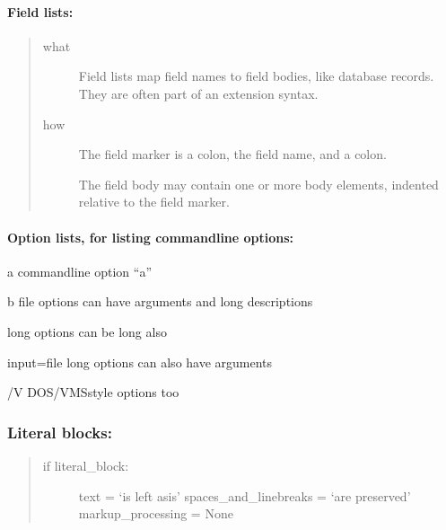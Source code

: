 \documentclass[a4paper,10pt,english]{report}
\begin{document}
\paragraph{Field lists:}
\label{\detokenize{prirucnik/evidencija:field-lists}}\begin{quote}\begin{description}
\item[{what}] \leavevmode
Field lists map field names to field bodies, like
database records.  They are often part of an extension
syntax.

\item[{how}] \leavevmode
The field marker is a colon, the field name, and a
colon.

The field body may contain one or more body elements,
indented relative to the field marker.

\end{description}\end{quote}


\paragraph{Option lists, for listing command\sphinxhyphen{}line options:}
\label{\detokenize{prirucnik/evidencija:option-lists-for-listing-command-line-options}}\begin{optionlist}{3cm}
\item [\sphinxhyphen{}a]  
command\sphinxhyphen{}line option “a”
\item [\sphinxhyphen{}b file]  
options can have arguments
and long descriptions
\item [\sphinxhyphen{}\sphinxhyphen{}long]  
options can be long also
\item [\sphinxhyphen{}\sphinxhyphen{}input=file]  
long options can also have
arguments
\item [/V]  
DOS/VMS\sphinxhyphen{}style options too
\end{optionlist}


\subsubsection{Literal blocks:}
\label{\detokenize{prirucnik/evidencija:literal-blocks}}\begin{quote}
\begin{description}
\item[{if literal\_block:}] \leavevmode
text = ‘is left as\sphinxhyphen{}is’
spaces\_and\_linebreaks = ‘are preserved’
markup\_processing = None

\end{description}
\end{quote}
\end{document}
